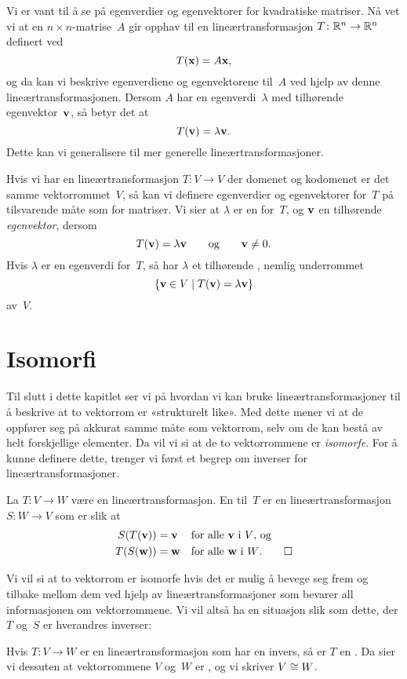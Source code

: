 Vi er vant til å se på egenverdier og egenvektorer for kvadratiske
matriser.  Nå vet vi at en $n \times n$-matrise~$A$ gir opphav til en
lineærtransformasjon $T \colon \mathbb{R}^n \to \mathbb{R}^n$ definert ved
\[
T(\mathbf{x}) = A\mathbf{x},
\]
og da kan vi beskrive egenverdiene og egenvektorene til~$A$ ved hjelp
av denne lineærtransformasjonen.  Dersom $A$ har en
egenverdi~$\lambda$ med tilhørende egenvektor~$\mathbf{v}$, så betyr det at
\[
T(\mathbf{v}) = \lambda \mathbf{v}.
\]
Dette kan vi generalisere til mer generelle lineærtransformasjoner.

Hvis vi har en lineærtransformasjon $T \colon V \to V$ der domenet og
kodomenet er det samme vektorrommet~$V$, så kan vi definere
egenverdier og egenvektorer for~$T$ på tilsvarende måte som for
matriser.  Vi sier at $\lambda$ er en  for~$T$, og
$\mathbf{v}$ en tilhørende \emph{egenvektor}, dersom
\[
T(\mathbf{v}) = \lambda \mathbf{v}
\qquad\text{og}\qquad
\mathbf{v} \ne 0.
\]
Hvis $\lambda$ er en egenverdi for~$T$, så har $\lambda$ et tilhørende
, nemlig underrommet
\[
\{ \mathbf{v} \in V \mid T(\mathbf{v}) = \lambda \mathbf{v} \}
\]
av~$V$.


\section*{Isomorfi}

Til slutt i dette kapitlet ser vi på hvordan vi kan bruke
lineærtransformasjoner til å beskrive at to vektorrom er «strukturelt
like».  Med dette mener vi at de oppfører seg på akkurat samme måte
som vektorrom, selv om de kan bestå av helt forskjellige elementer.
Da vil vi si at de to vektorrommene er \emph{isomorfe}.  For å kunne
definere dette, trenger vi først et begrep om inverser for
lineærtransformasjoner.

\begin{defn}
La $T \colon V \to W$ være en lineærtransformasjon.  En
 til~$T$ er en lineærtransformasjon $S \colon W \to V$
som er slik at
\begin{align*}
S(T(\mathbf{v})) &= \mathbf{v} &&\text{for alle $\mathbf{v}$ i~$V$, og} \\
T(S(\mathbf{w})) &= \mathbf{w} &&\text{for alle $\mathbf{w}$ i~$W$.}
\qedhere
\end{align*}
\end{defn}

Vi vil si at to vektorrom er isomorfe hvis det er mulig å bevege seg
frem og tilbake mellom dem ved hjelp av lineærtransformasjoner som
bevarer all informasjonen om vektorrommene.  Vi vil altså ha en
situasjon slik som dette, der $T$ og~$S$ er hverandres inverser:
\begin{center}
\end{center}
\begin{defn}
Hvis $T \colon V \to W$ er en lineærtransformasjon som har en invers,
så er $T$ en .  Da sier vi dessuten at vektorrommene
$V$ og~$W$ er , og vi skriver $V \cong W$.
\end{defn}





\kapittelslutt
